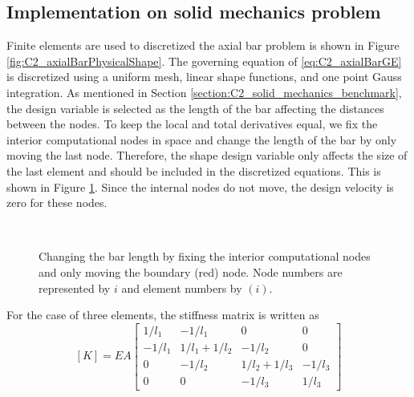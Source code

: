 \subsection{Implementation on solid mechanics problem}
Finite elements are used to discretized the axial bar problem is shown in Figure \ref{fig:C2_axialBarPhysicalShape}. The governing equation of \eqref{eq:C2_axialBarGE} is discretized using a uniform mesh, linear shape functions, and one point Gauss integration. As mentioned in Section \ref{section:C2_solid_mechanics_benchmark}, the design variable is selected as the length of the bar affecting the distances between the nodes. To keep the local and total derivatives equal, we fix the interior computational nodes in space and change the length of the bar by only moving the last node. Therefore, the shape design variable only affects the size of the last element and should be included in the discretized equations. This is shown in Figure \ref{fig:C2_axialBarComputationalDomain}. Since the internal nodes do not move, the design velocity is zero for these nodes.
%
\begin{figure}[H]
    \centering
    \\
    \caption{Changing the bar length by fixing the interior computational nodes and only moving the boundary (red) node. Node numbers are represented by $i$ and element numbers by $(i)$.}
    \label{fig:C2_axialBarComputationalDomain}
\end{figure}
%
For the case of three elements, the stiffness matrix is written as
%
\begin{equation}\label{eq:C2_stiffnessMatrixOfBar}
    [K] = 
    EA
    \begin{bmatrix}
    1/l_1 & -1/l_1 & 0 & 0 \\
    -1/l_1 & 1/l_1 + 1/l_2 & -1/l_2 & 0 \\
    0 & -1/l_2 & 1/l_2 + 1/l_3 & -1/l_3 \\
    0 & 0 & -1/l_3 & 1/l_3
    \end{bmatrix}
\end{equation}
